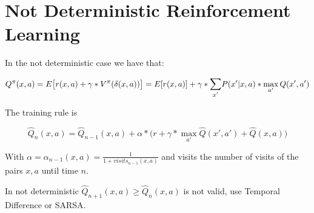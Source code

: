\section{Not Deterministic Reinforcement Learning}

In the not deterministic case we have that:

\[
Q^\pi(x, a) = E\big[r(x,a) + \gamma*V^\pi(\delta(x,a))\big] = E[r(x,a)] + \gamma*\mathlarger{\sum}_{x'} P(x' | x, a)*\max_{a'} Q(x',a')
\]

The training rule is

\[
\hat{Q}_n(x,a) = \hat{Q}_{n-1}(x,a) + \alpha*\big(r + \gamma*\max_{a'}\hat{Q}(x',a') + \hat{Q}(x,a)\big)
\]

With $\alpha = \alpha_{n-1}(x,a) = \frac{1}{1 + visits_{n-1}(x,a)}$ and visits the number of visits of the pairs $x,a$ until time $n$.

In not deterministic $\hat{Q}_{n+1}(x,a) \geq \hat{Q}_n(x,a)$ is not valid, use Temporal Difference or SARSA.
